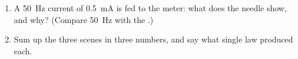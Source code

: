 \begin{problem}
\begin{enumerate}[resume]
        with $\theta$ measured from the position where the coil's plane
        contains $\vect B$.
  \item A \qty{50}{Hz} current of \qty{0.5}{mA}  is fed to the
        meter: what does the needle show, and why? (Compare \qty{50}{Hz}
        with the .)
  \item Sum up the three scenes in three numbers, and say what single
        law produced each.
\end{enumerate}
\end{problem}
